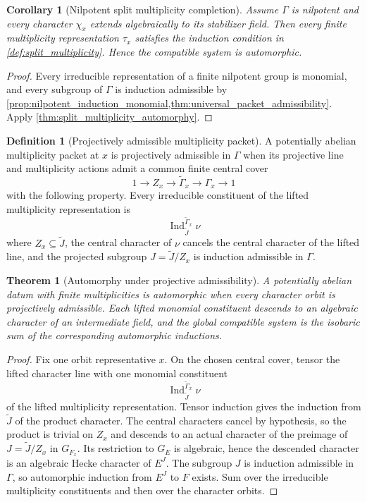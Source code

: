 \documentclass{aomart}
\newtheorem{theorem}{Theorem}[section]
\newtheorem{corollary}[corollary]{Corollary}
\theoremstyle{definition}
\newtheorem{definition}[definition]{Definition}
\theoremstyle{remark}
\newcommand{\Ind}{\operatorname{Ind}}
\begin{document}
\begin{corollary}[Nilpotent split multiplicity completion]\label{cor:nilpotent_split_multiplicity}
Assume \(\Gamma\) is nilpotent and every character \(\chi_x\) extends algebraically to its stabilizer field. Then every finite multiplicity representation \(\tau_x\) satisfies the induction condition in \cref{def:split_multiplicity}. Hence the compatible system is automorphic.
\end{corollary}

\begin{proof}
Every irreducible representation of a finite nilpotent group is monomial, and every subgroup of \(\Gamma\) is induction admissible by \cref{prop:nilpotent_induction_monomial,thm:universal_packet_admissibility}. Apply \cref{thm:split_multiplicity_automorphy}.
\end{proof}



\begin{definition}[Projectively admissible multiplicity packet]\label{def:projective_admissibility}
A potentially abelian multiplicity packet at \(x\) is projectively admissible in \(\Gamma\) when its projective line and multiplicity actions admit a common finite central cover
\[
1\longrightarrow Z_x
\longrightarrow
\widetilde\Gamma_x
\longrightarrow
\Gamma_x
\longrightarrow1
\]
with the following property. Every irreducible constituent of the lifted multiplicity representation is
\[
\Ind_{\widetilde J}^{\widetilde\Gamma_x}\nu
\]
where \(Z_x\subseteq\widetilde J\), the central character of \(\nu\) cancels the central character of the lifted line, and the projected subgroup \(J=\widetilde J/Z_x\) is induction admissible in \(\Gamma\).
\end{definition}

\begin{theorem}[Automorphy under projective admissibility]\label{thm:projective_multiplicity_automorphy}
A potentially abelian datum with finite multiplicities is automorphic when every character orbit is projectively admissible. Each lifted monomial constituent descends to an algebraic character of an intermediate field, and the global compatible system is the isobaric sum of the corresponding automorphic inductions.
\end{theorem}

\begin{proof}
Fix one orbit representative \(x\). On the chosen central cover, tensor the lifted character line with one monomial constituent
\[
\Ind_{\widetilde J}^{\widetilde\Gamma_x}\nu
\]
of the lifted multiplicity representation. Tensor induction gives the induction from \(\widetilde J\) of the product character. The central characters cancel by hypothesis, so the product is trivial on \(Z_x\) and descends to an actual character of the preimage of \(J=\widetilde J/Z_x\) in \(G_{F_x}\). Its restriction to \(G_E\) is algebraic, hence the descended character is an algebraic Hecke character of \(E^J\). The subgroup \(J\) is induction admissible in \(\Gamma\), so automorphic induction from \(E^J\) to \(F\) exists. Sum over the irreducible multiplicity constituents and then over the character orbits.
\end{proof}
\end{document}
